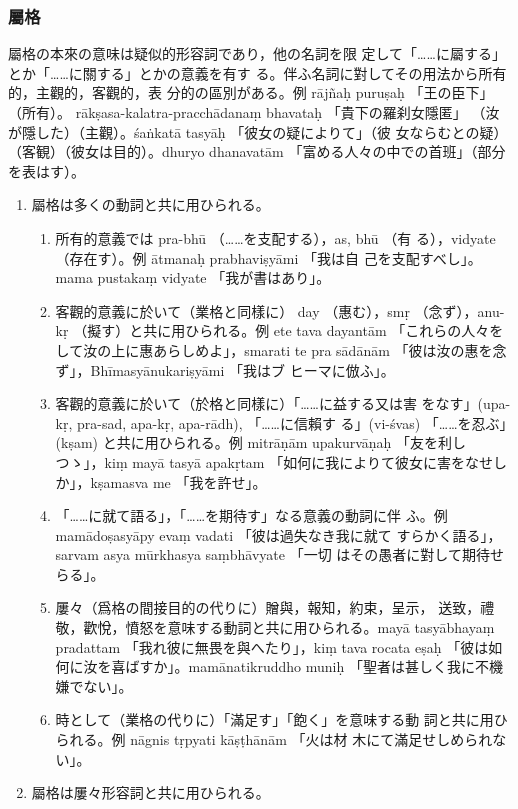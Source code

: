 \subsubsection{屬格}
\numberParagraph \label{np:229}
屬格の本來の意味は疑似的形容詞であり，他の名詞を限
定して「……に屬する」とか「……に關する」とかの意義を有す
る。伴ふ名詞に對してその用法から所有的，主觀的，客觀的，表
分的の區別がある。例 rājñaḥ puruṣaḥ 「王の臣下」（所有）。
rākṣasa-kalatra-pracchādanaṃ bhavataḥ 「貴下の羅刹女隱匿」
（汝が隱した）（主觀）。śaṅkatā tasyāḥ 「彼女の疑によりて」（彼
女ならむとの疑）（客観）（彼女は目的）。dhuryo dhanavatām
「富める人々の中での首班」（部分を表はす）。
\begin{enumerate}[label=(\arabic*)]
\item 屬格は多くの動詞と共に用ひられる。
\begin{enumerate}[label=(\alph*)]
\item 所有的意義では pra-bhū （……を支配する），as, bhū （有
る），vidyate （存在す）。例 ātmanaḥ prabhaviṣyāmi 「我は自
己を支配すべし」。mama pustakaṃ vidyate 「我が書はあり」。
\item 客觀的意義に於いて（業格と同樣に） day （惠む），smṛ
（念ず），anu-kṛ （擬す）と共に用ひられる。例 ete tava dayantām
「これらの人々をして汝の上に惠あらしめよ」，smarati te pra\-%
sādānām 「彼は汝の惠を念ず」，Bhīmasyānukariṣyāmi 「我はブ
ヒーマに倣ふ」。
\item 客觀的意義に於いて（於格と同樣に）「……に益する又は害
をなす」(upa-kṛ, pra-sad, apa-kṛ, apa-rādh), 「……に信賴す
る」(vi-śvas) 「……を忍ぶ」(kṣam) と共に用ひられる。例
mitrāṇām upakurvāṇaḥ 「友を利しつゝ」，kiṃ mayā tasyā
apakṛtam 「如何に我によりて彼女に害をなせしか」，kṣamasva
me 「我を許せ」。
\item \label{item:229d} 「……に就て語る」，「……を期待す」なる意義の動詞に伴
ふ。例 mamādoṣasyāpy evaṃ vadati 「彼は過失なき我に就て
すらかく語る」，sarvam asya mūrkhasya saṃbhāvyate 「一切
はその愚者に對して期待せらる」。
\item 屢々（爲格の間接目的の代りに）贈與，報知，約束，呈示，
送致，禮敬，歡悅，憤怒を意味する動詞と共に用ひられる。mayā
tasyābhayaṃ pradattam 「我れ彼に無畏を與へたり」，kiṃ tava
rocata eṣaḥ 「彼は如何に汝を喜ばすか」。mamānatikruddho
muniḥ 「聖者は甚しく我に不機嫌でない」。
\item 時として（業格の代りに）「滿足す」「飽く」を意味する動
詞と共に用ひられる。例 nāgnis tṛpyati kāṣṭhānām 「火は材
木にて滿足せしめられない」。
\end{enumerate}
\item 屬格は屢々形容詞と共に用ひられる。

\end{enumerate}
